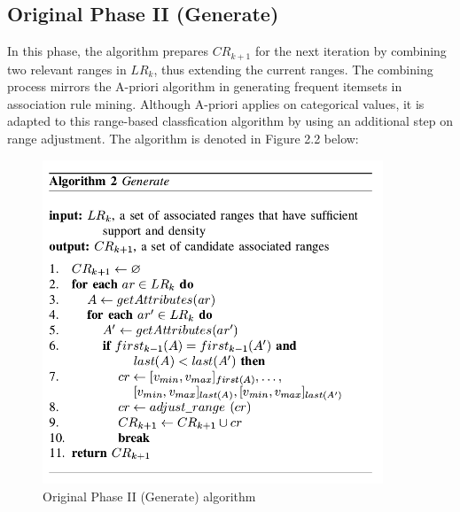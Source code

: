 \subsection{Original Phase II (Generate)}
In this phase, the algorithm prepares $CR_{k+1}$ for the next iteration by combining two relevant ranges in $LR_k$, thus extending the current ranges. The combining process mirrors the A-priori algorithm in generating frequent itemsets in association rule mining. Although A-priori applies on categorical values, it is adapted to this range-based classfication algorithm by using an additional step on range adjustment. The algorithm is denoted in Figure 2.2 below: 

\begin{figure}[!htbp]
    \centering
    \includegraphics[width=4in]{figures/DrShaoAlgorithm2}
    \caption[Figure 2.2: Original Phase II (Generate) algorithm]{Original Phase II (Generate) algorithm}
    \label{fig:figure2_2}
\end{figure}

